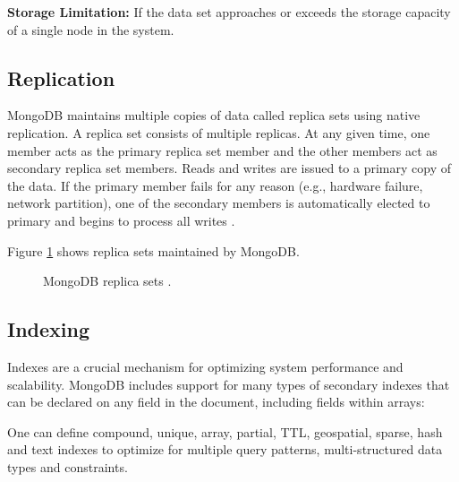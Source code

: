 \documentclass[9pt,twocolumn,twoside]{../../styles/osajnl}
\begin{document}
{\bfseries Storage Limitation:} If the data set approaches or exceeds the
storage capacity of a single node in the system.

\subsection {Replication}

MongoDB maintains multiple copies of data called replica sets using native replication. A replica set consists of multiple replicas. At any given time, one member acts as the primary replica set member and the other members act as secondary replica set members. Reads and writes are issued to a primary copy of the data. If the primary member fails for any reason (e.g., hardware failure, network partition), one of the secondary members is automatically elected to primary and begins to process all writes \cite{www-mongo6}.

Figure \ref{fig:figure2} shows replica sets maintained by MongoDB.

\begin{figure}[htbp]
\centering
{}
\caption{MongoDB replica sets \cite{www-mongo4}.} 
\label{fig:figure2}
\end{figure}

\subsection {Indexing}

Indexes are a crucial mechanism for optimizing system performance and scalability. MongoDB includes support for many types of secondary indexes that can be declared on any field in the document, including fields within arrays:

One can define compound, unique, array, partial, TTL, geospatial, sparse, hash and text indexes to optimize for multiple query patterns, multi-structured data types and constraints.
\end{document}

